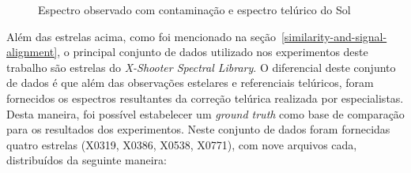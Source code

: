 \begin{figure}[htb]
  \centering
  \hfill
  \caption{Espectro observado com contaminação e espectro telúrico do Sol}
  \label{fig:two-stars-sun}
\end{figure}


Além das estrelas acima, como foi mencionado na seção~\ref{similarity-and-signal-alignment}, o principal conjunto de dados utilizado nos experimentos deste trabalho são estrelas do \textit{X-Shooter Spectral Library}. O diferencial deste conjunto de dados é que além das observações estelares e referenciais telúricos, foram fornecidos os espectros resultantes da correção telúrica realizada por especialistas. Desta maneira, foi possível estabelecer um \textit{ground truth} como base de comparação para os resultados dos experimentos. Neste conjunto de dados foram fornecidas quatro estrelas (X0319, X0386, X0538, X0771), com nove arquivos cada, distribuídos da seguinte maneira:

